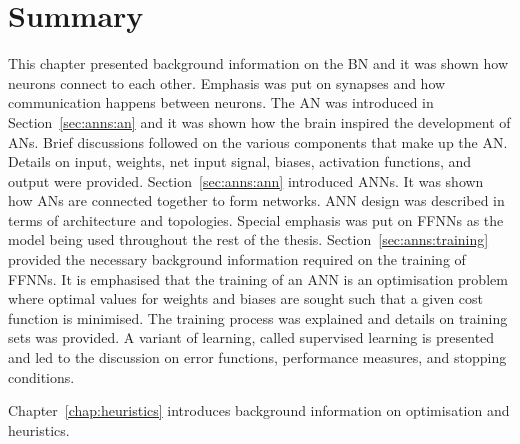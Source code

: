 \section{Summary}
\label{sec:anns:summary}

This chapter presented background information on the \ac{BN} and it was shown
how neurons connect to each other. Emphasis was put on synapses
and how communication happens between neurons. The \ac{AN} was introduced in
Section~\ref{sec:anns:an} and it was shown how the brain inspired the
development of \acp{AN}. Brief discussions followed on the various components
that make up the \ac{AN}. Details on input, weights, net
input signal, biases, activation functions, and
output were provided.  Section~\ref{sec:anns:ann} introduced \acp{ANN}. It was
shown how \acp{AN} are connected together to form networks. \ac{ANN} design was
described in terms of architecture and topologies. Special emphasis was put on
\acp{FFNN} as the model being used throughout the rest of the thesis.
Section~\ref{sec:anns:training} provided the necessary background information
required on the training of \acp{FFNN}. It is emphasised that the training of an
\ac{ANN} is an optimisation problem where optimal values for weights and biases
are sought such that a given cost function is minimised. The training process
was explained and details on training sets was provided. A variant of learning,
called supervised learning is presented and led to
the discussion on error functions, performance measures, and stopping
conditions.

Chapter~\ref{chap:heuristics} introduces background information on optimisation
and heuristics. 

